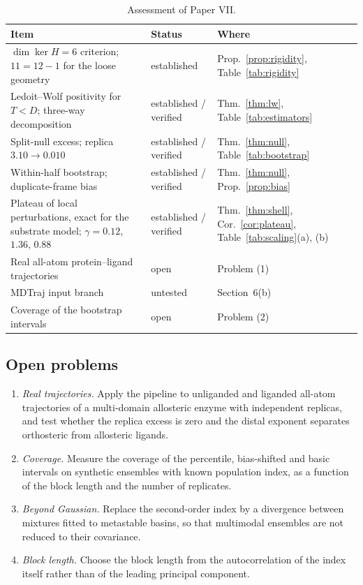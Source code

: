 \documentclass[11pt,reqno]{amsart}
\theoremstyle{plain}
\theoremstyle{definition}
\theoremstyle{remark}
\numberwithin{equation}{section}
\begin{document}
\begin{table}[ht]
\centering\small
\caption{Assessment of Paper VII.}
\label{tab:assessment}
\begin{tabular}{@{}>{\raggedright\arraybackslash}p{}>{\raggedright\arraybackslash}p{}>{\raggedright\arraybackslash}p{}@{}}
\toprule
Item & Status & Where \\
\midrule
$\dim\ker H=6$ criterion; $11=12-1$ for the loose geometry & established & Prop.~\ref{prop:rigidity}, Table~\ref{tab:rigidity} \\
Ledoit--Wolf positivity for $T<D$; three-way decomposition & established / verified & Thm.~\ref{thm:lw}, Table~\ref{tab:estimators} \\
Split-null excess; replica $3.10\to0.010$ & established / verified & Thm.~\ref{thm:null}, Table~\ref{tab:bootstrap} \\
Within-half bootstrap; duplicate-frame bias & established / verified & Thm.~\ref{thm:null}, Prop.~\ref{prop:bias} \\
Plateau of local perturbations, exact for the substrate model; $\gamma=0.12$, $1.36$, $0.88$ & established / verified & Thm.~\ref{thm:shell}, Cor.~\ref{cor:plateau}, Table~\ref{tab:scaling}(a), (b) \\
Real all-atom protein--ligand trajectories & open & Problem (1) \\
MDTraj input branch & untested & Section~6(b) \\
Coverage of the bootstrap intervals & open & Problem (2) \\
\bottomrule
\end{tabular}
\end{table}

\subsection*{Open problems}
\begin{enumerate}[label=(\arabic*),leftmargin=*]
\item \emph{Real trajectories.} Apply the pipeline to unliganded and liganded all-atom trajectories of a multi-domain allosteric enzyme with independent replicas, and test whether the replica excess is zero and the distal exponent separates orthosteric from allosteric ligands.
\item \emph{Coverage.} Measure the coverage of the percentile, bias-shifted and basic intervals on synthetic ensembles with known population index, as a function of the block length and the number of replicates.
\item \emph{Beyond Gaussian.} Replace the second-order index by a divergence between mixtures fitted to metastable basins, so that multimodal ensembles are not reduced to their covariance.
\item \emph{Block length.} Choose the block length from the autocorrelation of the index itself rather than of the leading principal component.
\end{enumerate}
\end{document}
